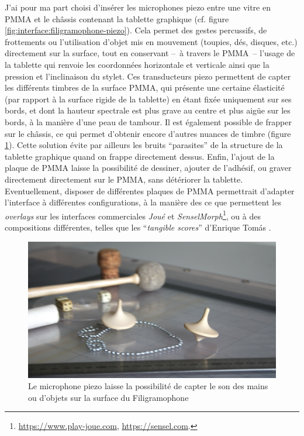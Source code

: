 \indent J'ai pour ma part choisi d'insérer les microphones piezo entre une vitre en \gls{PMMA} et le châssis contenant la tablette graphique (cf. figure \ref{fig:interface:filigramophone-piezo}). Cela permet des gestes percussifs, de frottements ou l'utilisation d'objet mis en mouvement (toupies, dés, disques, etc.) directement sur la surface, tout en conservant --~à travers le \gls{PMMA}~-- l'usage de la tablette qui renvoie les coordonnées horizontale et verticale ainsi que la pression et l'inclinaison du stylet. Ces transducteurs piezo permettent de capter les différents timbres de la surface \gls{PMMA}, qui présente une certaine élasticité (par rapport à la surface rigide de la tablette) en étant fixée uniquement sur ses bords, et dont la hauteur spectrale est plus grave au centre et plus aigüe sur les bords, à la manière d'une peau de tambour. Il est également possible de frapper sur le châssis, ce qui permet d'obtenir encore d'autres nuances de timbre (figure \ref{fig:interface:filigramophone-toupie}). Cette solution évite par ailleurs les bruits ``parasites'' de la structure de la tablette graphique quand on frappe directement dessus. Enfin, l'ajout de la plaque de \gls{PMMA} laisse la possibilité de dessiner, ajouter de l'adhésif, ou graver directement directement sur le \gls{PMMA}, sans détériorer la tablette. Eventuellement, disposer de différentes plaques de \gls{PMMA} permettrait d'adapter l'interface à différentes configurations, à la manière des ce que permettent les \textit{overlays} sur les interfaces commerciales \textit{Joué} et \textit{SenselMorph}\footnote{\url{https://www.play-joue.com}, \url{https://sensel.com}.}, ou à des compositions différentes, telles que les ``\textit{tangible scores}'' d'Enrique Tomás \cite{tomas_tangible_2014}.

\begin{figure}[!htbp]
	\captionsetup{format=plain}%
	\includegraphics[width=\textwidth]{gfx/05_interfaces/filigramophone-toupie.jpg}
	\caption[Captation du son des mains ou d'objets sur la surface du Filigramophone]{Le microphone piezo laisse la possibilité de capter le son des mains ou d'objets sur la surface du Filigramophone}
	\label{fig:interface:filigramophone-toupie}
\end{figure}

